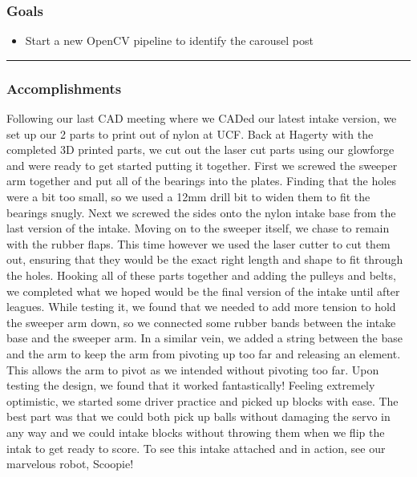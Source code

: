 \subsubsection*{Goals}
\begin{itemize}
    \item Start a new OpenCV pipeline to identify the carousel post 

\end{itemize} 

\noindent\hfil\rule{\textwidth}{.4pt}\hfil

\subsubsection*{Accomplishments}
Following our last CAD meeting where we CADed our latest intake version, we set up our 2 parts to print out of nylon at UCF. Back at Hagerty with the completed 3D printed parts, we cut out the laser cut parts using our glowforge and were ready to get started putting it together. First we screwed the sweeper arm together and put all of the bearings into the plates. Finding that the holes were a bit too small, so we used a 12mm drill bit to widen them to fit the bearings snugly. Next we screwed the sides onto the nylon intake base from the last version of the intake. Moving on to the sweeper itself, we chase to remain with the rubber flaps. This time however we used the laser cutter to cut them out, ensuring that they would be the exact right length and shape to fit through the holes. Hooking all of these parts together and adding the pulleys and belts, we completed what we hoped would be the final version of the intake until after leagues. While testing it, we found that we needed to add more tension to hold the sweeper arm down, so we connected some rubber bands between the intake base and the sweeper arm. In a similar vein, we added a string between the base and the arm to keep the arm from pivoting up too far and releasing an element. This allows the arm to pivot as we intended without pivoting too far. Upon testing the design, we found that it worked fantastically! Feeling extremely optimistic, we started some driver practice and picked up blocks with ease. The best part was that we could both pick up balls without damaging the servo in any way and we could intake blocks without throwing them when we flip the intak to get ready to score. To see this intake attached and in action, see our marvelous robot, Scoopie!



